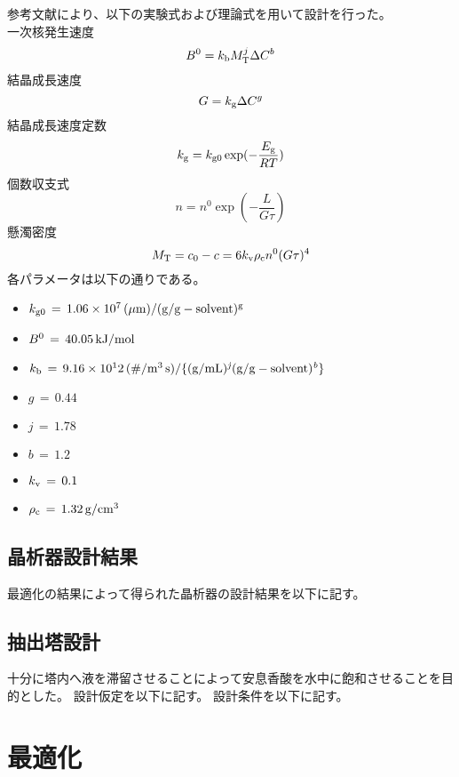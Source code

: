\documentclass[a4j]{jsreport}
\begin{document}
参考文献\cite{晶析}により、以下の実験式および理論式を用いて設計を行った。\\
一次核発生速度
\begin{equation}
    B^0 = k_{{\rm b}}M_{{\rm T}}^j \Delta C^b
\end{equation}
結晶成長速度
\begin{equation}
    G = k_{{\rm g}}\Delta C^g
\end{equation}
結晶成長速度定数
\begin{equation}
    k_{{\rm g}} = k_{{\rm g0}} \exp(-\frac{E_{{\rm g}}}{RT})
\end{equation}
個数収支式
\begin{equation}
    n=n^0 \exp(-\frac{L}{G\tau})
\end{equation}
懸濁密度
\begin{equation}
    M_{{\rm T}} = c_0-c = 6k_{{\rm v}}\rho_{{\rm c}}n^0(G\tau)^4
\end{equation}
各パラメータは以下の通りである。
\begin{itemize}
    \item[] $k_{{\rm g0}}\,=\,1.06\times10^7\,{\rm (\mu m)/(g/g-solvent)^g}$
    \item[] $B^{{\rm 0}}\,=\,40.05\,{\rm kJ/mol}$
    \item[] $k_{{\rm b}}\,=\,9.16\times10^12\,{\rm (\#/ m^3\,s)/\{(g/mL)^{{\it j}}(g/g-solvent)^{{\it b}}\}}$
    \item[] $g\,=\,0.44\,$
    \item[] $j\,=\,1.78\,$
    \item[] $b\,=\,1.2\,$
    \item[] $k_{{\rm v}}\,=\,0.1\,$
    \item[] $\rho_{{\rm c}}\,=\,1.32\,{\rm g/cm^3}$ 
\end{itemize}

\section{晶析器設計結果}
最適化の結果によって得られた晶析器の設計結果を以下に記す。

\section{抽出塔設計}
十分に塔内へ液を滞留させることによって安息香酸を水中に飽和させることを目的とした。
設計仮定を以下に記す。
設計条件を以下に記す。

\newpage
\chapter{最適化}
\end{document}
